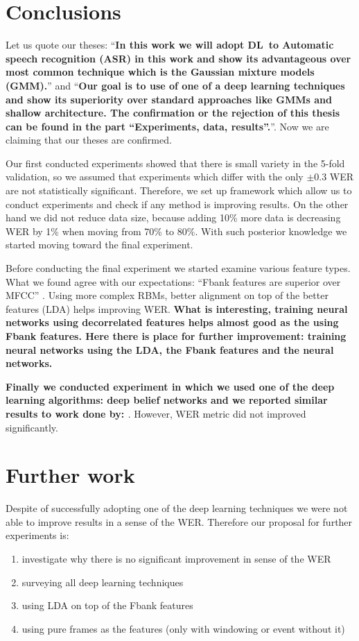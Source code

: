 \section{Conclusions}
Let us quote our theses: 
``\textbf{In this work we will adopt DL~to Automatic speech recognition (ASR) in this work and show its advantageous over most common technique which is the Gaussian mixture models (GMM).}'' and ``\textbf{Our goal is to use of one of a deep learning techniques and show its superiority over standard approaches like GMMs and shallow architecture. The confirmation or the rejection of this thesis can be found in the part ``Experiments, data, results''.}''. Now we are claiming that our theses are confirmed.

Our first conducted experiments showed that there is small variety in the 5-fold validation, so we assumed that experiments which differ with the only $\pm 0.3$ WER are not statistically significant. Therefore, we set up framework which allow us to conduct experiments and check if any method is improving results. On the other hand we did not reduce data size, because adding 10\% more data is decreasing WER by 1\% when moving from 70\% to 80\%. With such posterior knowledge we started moving toward the final experiment.

Before conducting the final experiment we started examine various feature types. What we found agree with our expectations: ``Fbank features are superior over MFCC'' \parencite{hinton_deep_2012}. Using more complex RBMs, better alignment on top of the better features (LDA) helps improving WER. \textbf{What is interesting, training neural networks using decorrelated features helps almost good as the using Fbank features. Here there is place for further improvement: training neural networks using the LDA, the Fbank features and the neural networks.}

\textbf{Finally we conducted experiment in which we used one of the deep learning algorithms: deep belief networks and we reported similar results to work done by: \textcite{mohamed_phone_2010}}. However, WER metric did not improved significantly. 

\section{Further work}
Despite of successfully adopting one of the deep learning techniques we were not able to improve results in a sense of the WER. Therefore our proposal for further experiments is:
\begin{enumerate}
\item investigate why there is no significant improvement in sense of the WER
\item surveying all deep learning techniques
\item using LDA on top of the Fbank features
\item using pure frames as the features (only with windowing or event without it)
\end{enumerate}
